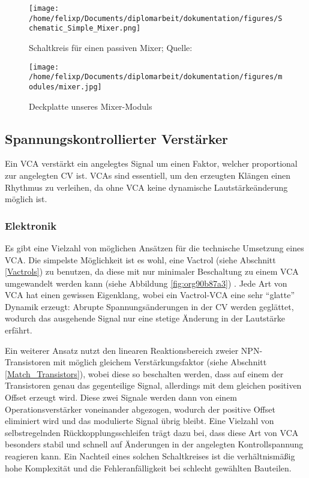 \begin{figure}[htbp]
\centering
\texttt{[image: /home/felixp/Documents/diplomarbeit/dokumentation/figures/Schematic\_Simple\_Mixer.png]}
\caption{\label{fig:org9e1f1ad}Schaltkreis für einen passiven Mixer; Quelle: \cite{miaw:mixer}}
\end{figure}

\begin{figure}[htbp]
\centering
\texttt{[image: /home/felixp/Documents/diplomarbeit/dokumentation/figures/modules/mixer.jpg]}
\caption{\label{fig:org3f9c11e}Deckplatte unseres Mixer-Moduls}
\end{figure}

\newpage
\subsection{Spannungskontrollierter Verstärker \label{VCA}}
\label{sec:org303de06}
Ein \acf{VCA} verstärkt ein angelegtes Signal um einen Faktor, welcher proportional zur angelegten \acl{CV} ist. \acp{VCA} sind essentiell, um den erzeugten Klängen einen Rhythmus zu verleihen, da ohne \ac{VCA} keine dynamische Lautstärkeänderung möglich ist.

\subsubsection{Elektronik}
\label{sec:org6aab67a}
Es gibt eine Vielzahl von möglichen Ansätzen für die technische Umsetzung eines \ac{VCA}. Die simpelste Möglichkeit ist es wohl, eine Vactrol (siehe Abschnitt \ref{Vactrols}) zu benutzen, da diese mit nur minimaler Beschaltung zu einem \ac{VCA} umgewandelt werden kann (siehe Abbildung \ref{fig:org90b87a3}) \cite{miaw:vca}. Jede Art von \ac{VCA} hat einen gewissen Eigenklang, wobei ein Vactrol-VCA eine sehr "`glatte"' Dynamik erzeugt: Abrupte Spannungsänderungen in der \acl{CV} werden geglättet, wodurch das ausgehende Signal nur eine stetige Änderung in der Lautstärke erfährt.

Ein weiterer Ansatz nutzt den linearen Reaktionsbereich zweier NPN-Transistoren mit möglich gleichem Verstärkungsfaktor (siehe Abschnitt \ref{Match_Transistors}), wobei diese so beschalten werden, dass auf einem der Transistoren genau das gegenteilige Signal, allerdings mit dem gleichen positiven Offset erzeugt wird. Diese zwei Signale werden dann von einem Operationsverstärker voneinander abgezogen, wodurch der positive Offset eliminiert wird und das modulierte Signal übrig bleibt. Eine Vielzahl von selbstregelnden Rückkopplungsschleifen trägt dazu bei, dass diese Art von \ac{VCA} besonders stabil und schnell auf Änderungen in der angelegten Kontrollspannung reagieren kann. Ein Nachteil eines solchen Schaltkreises ist die verhältnismäßig hohe Komplexität und die Fehleranfälligkeit bei schlecht gewählten Bauteilen.

